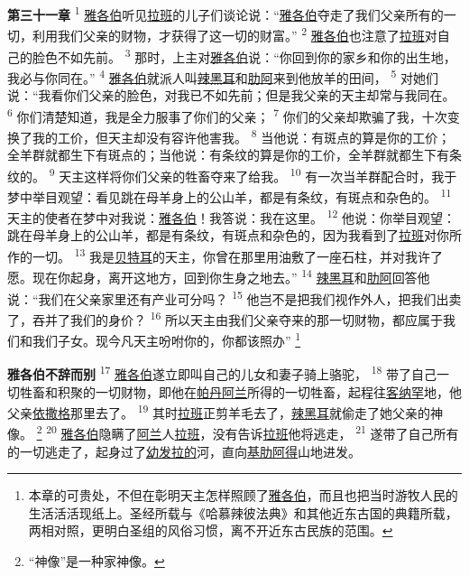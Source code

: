 \textbf{第三十一章\quad}
\textsuperscript{1}
\uline{雅各伯}听见\uline{拉班}的儿子们谈论说：“\uline{雅各伯}夺走了我们父亲所有的一切，利用我们父亲的财物，才获得了这一切的财富。”
\textsuperscript{2}
\uline{雅各伯}也注意了\uline{拉班}对自己的脸色不如先前。
\textsuperscript{3}
那时，上主对\uline{雅各伯}说：“你回到你的家乡和你的出生地，我必与你同在。”
\textsuperscript{4}
\uline{雅各伯}就派人叫\uline{辣黑耳}和\uline{肋阿}来到他放羊的田间，
\textsuperscript{5}
对她们说：“我看你们父亲的脸色，对我已不如先前；但是我父亲的天主却常与我同在。
\textsuperscript{6}
你们清楚知道，我是全力服事了你们的父亲；
\textsuperscript{7}
你们的父亲却欺骗了我，十次变换了我的工价，但天主却没有容许他害我。
\textsuperscript{8}
当他说：有斑点的算是你的工价；全羊群就都生下有斑点的；当他说：有条纹的算是你的工价，全羊群就都生下有条纹的。
\textsuperscript{9}
天主这样将你们父亲的牲畜夺来了给我。
\textsuperscript{10}
有一次当羊群配合时，我于梦中举目观望：看见跳在母羊身上的公山羊，都是有条纹，有斑点和杂色的。
\textsuperscript{11}
天主的使者在梦中对我说：\uline{雅各伯}！我答说：我在这里。
\textsuperscript{12}
他说：你举目观望：跳在母羊身上的公山羊，都是有条纹，有斑点和杂色的，因为我看到了\uline{拉班}对你所作的一切。
\textsuperscript{13}
我是\uline{贝特耳}的天主，你曾在那里用油敷了一座石柱，并对我许了愿。现在你起身，离开这地方，回到你生身之地去。”
\textsuperscript{14}
\uline{辣黑耳}和\uline{肋阿}回答他说：“我们在父亲家里还有产业可分吗？
\textsuperscript{15}
他岂不是把我们视作外人，把我们出卖了，吞并了我们的身价？
\textsuperscript{16}
所以天主由我们父亲夺来的那一切财物，都应属于我们和我们子女。现今凡天主吩咐你的，你都该照办”
\footnote{本章的可贵处，不但在彰明天主怎样照顾了\uline{雅各伯}，而且也把当时游牧人民的生活活活现纸上。圣经所载与《哈慕辣彼法典》和其他近东古国的典籍所载，两相对照，更明白圣组的风俗习惯，离不开近东古民族的范围。}

\textbf{雅各伯不辞而别\quad}
\textsuperscript{17}
\uline{雅各伯}遂立即叫自己的儿女和妻子骑上骆驼，
\textsuperscript{18}
带了自己一切牲畜和积聚的一切财物，即他在\uline{帕丹}\uline{阿兰}所得的一切牲畜，起程往\uline{客纳罕}地，他父亲\uline{依撒格}那里去了。
\textsuperscript{19}
其时\uline{拉班}正剪羊毛去了，\uline{辣黑耳}就偷走了她父亲的神像。
\footnote{“神像”是一种家神像。}
\textsuperscript{20}
\uline{雅各伯}隐瞒了\uline{阿兰}人\uline{拉班}，没有告诉\uline{拉班}他将逃走，
\textsuperscript{21}
遂带了自己所有的一切逃走了，起身过了\uline{幼发}\uline{拉的}河，直向\uline{基肋}\uline{阿得}山地进发。


